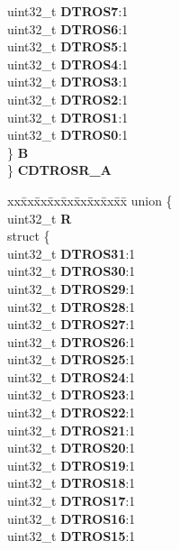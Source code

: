 \begin{DoxyCompactItemize}
\begin{tabbing}
\>\>uint32\_t {\bfseries DTROS7}:1\\
\>\>uint32\_t {\bfseries DTROS6}:1\\
\>\>uint32\_t {\bfseries DTROS5}:1\\
\>\>uint32\_t {\bfseries DTROS4}:1\\
\>\>uint32\_t {\bfseries DTROS3}:1\\
\>\>uint32\_t {\bfseries DTROS2}:1\\
\>\>uint32\_t {\bfseries DTROS1}:1\\
\>\>uint32\_t {\bfseries DTROS0}:1\\
\>\} {\bfseries B}\\
\} {\bfseries CDTROSR\_A}\\

\end{tabbing}\item 
\mbox{\label{structETPU__tag_a8d32e5a1d1405a3c46e0094168f51b0b}} 
\begin{tabbing}
xx\=xx\=xx\=xx\=xx\=xx\=xx\=xx\=xx\=\kill
union \{\\
\>uint32\_t {\bfseries R}\\
\>struct \{\\
\>\>uint32\_t {\bfseries DTROS31}:1\\
\>\>uint32\_t {\bfseries DTROS30}:1\\
\>\>uint32\_t {\bfseries DTROS29}:1\\
\>\>uint32\_t {\bfseries DTROS28}:1\\
\>\>uint32\_t {\bfseries DTROS27}:1\\
\>\>uint32\_t {\bfseries DTROS26}:1\\
\>\>uint32\_t {\bfseries DTROS25}:1\\
\>\>uint32\_t {\bfseries DTROS24}:1\\
\>\>uint32\_t {\bfseries DTROS23}:1\\
\>\>uint32\_t {\bfseries DTROS22}:1\\
\>\>uint32\_t {\bfseries DTROS21}:1\\
\>\>uint32\_t {\bfseries DTROS20}:1\\
\>\>uint32\_t {\bfseries DTROS19}:1\\
\>\>uint32\_t {\bfseries DTROS18}:1\\
\>\>uint32\_t {\bfseries DTROS17}:1\\
\>\>uint32\_t {\bfseries DTROS16}:1\\
\>\>uint32\_t {\bfseries DTROS15}:1\\

\end{tabbing}
\end{DoxyCompactItemize}
